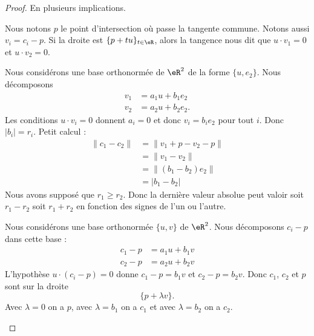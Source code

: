 \begin{proof}
	En plusieurs implications.
	\begin{subproof}
		\spitem[\ref{ITEMooLZHQooWsbQZl}\( \Rightarrow\)\ref{ITEMooNIZQooSeAWLm}]
		Nous notons \( p\) le point d'intersection où passe la tangente commune. Notons aussi \( v_i=c_i-p\). Si la droite est \( \{ p+tu \}_{t\in \eR}\), alors la tangence nous dit que \( u\cdot v_1=0\) et \( u\cdot v_2=0\).

		Nous considérons une base orthonormée de \( \eR^2\) de la forme \( \{ u,e_2 \}\). Nous décomposons
		\begin{subequations}
			\begin{align}
				v_1 & =a_1u+b_1e_2  \\
				v_2 & =a_2u+b_2e_2.
			\end{align}
		\end{subequations}
		Les conditions \( u\cdot v_i=0\) donnent \( a_i=0\) et donc \( v_i=b_ie_2\) pour tout \( i\). Donc \( | b_i |=r_i\). Petit calcul :
		\begin{subequations}
			\begin{align}
				\| c_1-c_2 \| & =\| v_1+p-v_2-p \|  \\
				              & =\| v_1-v_2 \|      \\
				              & =\| (b_1-b_2)e_2 \| \\
				              & =| b_1-b_2 |
			\end{align}
		\end{subequations}
		Nous avons supposé que \( r_1\geq r_2\). Donc la dernière valeur absolue peut valoir soit \( r_1-r_2\) soit \( r_1+r_2\) en fonction des signes de l'un ou l'autre.

		\spitem[\ref{ITEMooZUKWooPUVpwH}\( \Rightarrow\)\ref{ITEMooXRTVooUxEHrk}]
		Nous considérons une base orthonormée \( \{ u,v \}\) de \( \eR^2\). Nous décomposons \( c_i-p\) dans cette base :
		\begin{subequations}
			\begin{align}
				c_1-p & =a_1u+b_1v \\
				c_2-p & =a_2u+b_2v
			\end{align}
		\end{subequations}
		L'hypothèse \( u\cdot (c_i-p)=0\) donne \( c_1-p=b_1v\) et \( c_2-p=b_2v\). Donc \( c_1\), \( c_2\) et \( p\) sont sur la droite
		\begin{equation}
			\{ p+\lambda v \}.
		\end{equation}
		Avec \( \lambda=0\) on a \( p\), avec \( \lambda=b_1\) on a \( c_1\) et avec \( \lambda=b_2\) on a \( c_2\).
	\end{subproof}
\end{proof}


